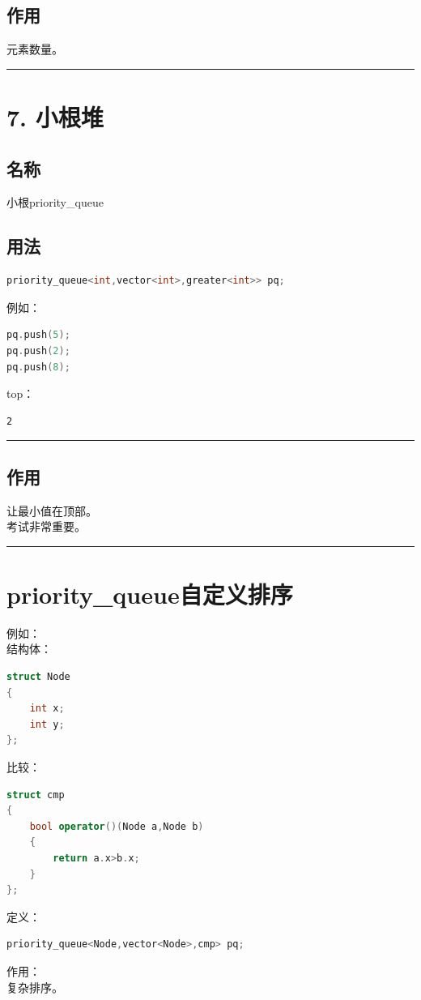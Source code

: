 \documentclass[9pt,twocolumn]{extarticle}
\begin{document}
\subsection{作用}
元素数量。

\noindent\rule{\linewidth}{0.4pt}

\section{7. 小根堆}

\subsection{名称}
小根priority\_queue

\subsection{用法}
\begin{lstlisting}[language=C++]
priority_queue<int,vector<int>,greater<int>> pq;
\end{lstlisting}
例如：
\begin{lstlisting}[language=C++]
pq.push(5);
pq.push(2);
pq.push(8);
\end{lstlisting}
top：
\begin{lstlisting}
2
\end{lstlisting}

\noindent\rule{\linewidth}{0.4pt}

\subsection{作用}
让最小值在顶部。\\
考试非常重要。

\noindent\rule{\linewidth}{0.4pt}

\section{priority\_queue自定义排序}

例如：\\
结构体：
\begin{lstlisting}[language=C++]
struct Node
{
    int x;
    int y;
};
\end{lstlisting}
比较：
\begin{lstlisting}[language=C++]
struct cmp
{
    bool operator()(Node a,Node b)
    {
        return a.x>b.x;
    }
};
\end{lstlisting}
定义：
\begin{lstlisting}[language=C++]
priority_queue<Node,vector<Node>,cmp> pq;
\end{lstlisting}
作用：\\
复杂排序。
\end{document}
